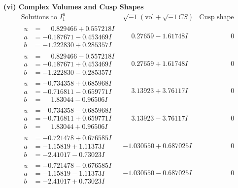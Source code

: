 \documentclass[1p]{elsarticle_modified}
\theoremstyle{definition}
\newcommand{\I}{\sqrt{-1}}
\begin{document}
\newpage\flushleft \textbf{(vi) Complex Volumes and Cusp Shapes}
$$\begin{array}{c|c|c}  
\text{Solutions to }I^u_{1}& \I (\text{vol} + \sqrt{-1}CS) & \text{Cusp shape}\\
 \hline 
\begin{aligned}
u &= \phantom{-}0.829466 + 0.557218 I \\
a &= -0.187671 - 0.453469 I \\
b &= -1.222830 + 0.285357 I\end{aligned}
 & \phantom{-}0.27659 - 1.61748 I & \phantom{-0.000000 } 0 \\ \hline\begin{aligned}
u &= \phantom{-}0.829466 - 0.557218 I \\
a &= -0.187671 + 0.453469 I \\
b &= -1.222830 - 0.285357 I\end{aligned}
 & \phantom{-}0.27659 + 1.61748 I & \phantom{-0.000000 } 0 \\ \hline\begin{aligned}
u &= -0.734358 + 0.685968 I \\
a &= -0.716811 - 0.659771 I \\
b &= \phantom{-}1.83044 - 0.96506 I\end{aligned}
 & \phantom{-}3.13923 + 3.76117 I & \phantom{-0.000000 } 0 \\ \hline\begin{aligned}
u &= -0.734358 - 0.685968 I \\
a &= -0.716811 + 0.659771 I \\
b &= \phantom{-}1.83044 + 0.96506 I\end{aligned}
 & \phantom{-}3.13923 - 3.76117 I & \phantom{-0.000000 } 0 \\ \hline\begin{aligned}
u &= -0.721478 + 0.676585 I \\
a &= -1.15819 + 1.11373 I \\
b &= -2.41017 - 0.73023 I\end{aligned}
 & -1.030550 + 0.687025 I & \phantom{-0.000000 } 0 \\ \hline\begin{aligned}
u &= -0.721478 - 0.676585 I \\
a &= -1.15819 - 1.11373 I \\
b &= -2.41017 + 0.73023 I\end{aligned}
 & -1.030550 - 0.687025 I & \phantom{-0.000000 } 0 \\ \hline\begin{aligned}

\end{aligned}
\end{array}$$
\end{document}
